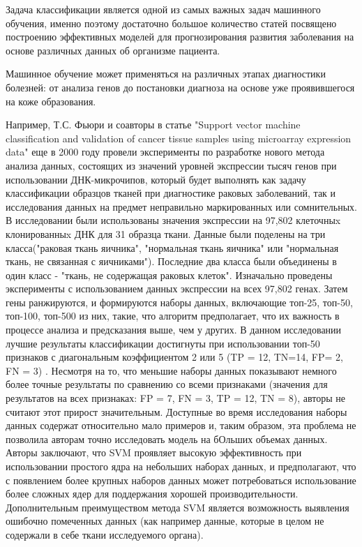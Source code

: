 \documentclass[14pt, a4paper]{extarticle}
\begin{document}
 Задача классификации является одной из самых важных задач машинного обучения, именно поэтому достаточно большое количество статей посвящено построению эффективных моделей для прогнозирования развития заболевания на основе различных данных об организме пациента.

Машинное обучение может применяться на различных этапах диагностики болезней: от анализа генов до постановки диагноза на основе уже проявившегося на коже образования.

Например, Т.С. Фьюри и соавторы \cite{furey2000support} в статье "Support vector
machine classification and validation of cancer tissue samples using
microarray expression data" еще в 2000 году провели эксперименты по  разработке нового метода анализа данных, состоящих из  значений уровней экспрессии тысяч генов при использовании ДНК-микрочипов,  который будет выполнять  как задачу классификации образцов тканей при диагностике раковых заболеваний, так и  исследования данных на предмет неправильно маркированных или сомнительных. В исследовании были использованы значения экспрессии на 97,802 клеточныx клонированныx ДНК для 31 образца ткани. Данные были поделены на три класса("раковая ткань яичника", "нормальная ткань яичника" или "нормальная ткань, не связанная с яичниками"). Последние два класса были объединены в один класс - "ткань, не содержащая раковых клеток". Изначально проведены эксперименты с использованием данных экспрессии на всех 97,802 генах. Затем гены ранжируются, и формируются наборы данных, включающие топ-25, топ-50, топ-100, топ-500 из них, такие, что алгоритм предполагает, что их важность  в процессе анализа и предсказания выше, чем у других. В данном исследовании лучшие результаты классификации достигнуты при использовании топ-50 признаков с диагональным коэффициентом 2 или 5 (TP = 12, TN=14, FP= 2, FN = 3) . Несмотря на то, что меньшие наборы данных показывают  немного более точные результаты по сравнению со всеми признаками (значения для результатов на всех признаках: FP = 7, FN = 3, TP = 12, TN = 8), авторы не считают этот прирост значительным. Доступные во время исследования наборы данных содержат относительно мало примеров и, таким образом, эта проблема не позволила авторам точно исследовать модель на бОльших объемах данных. Авторы заключают, что SVM проявляет высокую эффективность при использовании простого ядра на небольших наборах данных, и  предполагают, что с появлением более крупных наборов данных может потребоваться использование более сложных ядер для поддержания хорошей производительности. Дополнительным преимуществом метода SVM является возможность выявления ошибочно помеченных данных (как например данные, которые  в целом не содержали в себе ткани исследуемого органа). 
\end{document}
